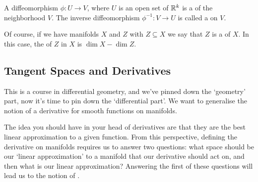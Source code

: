 \documentclass[a4paper, 10pt, twocolumn]{amsart}
\begin{document}
\begin{definition}[Chart]
    A diffeomorphism $\phi: U \rightarrow V$, where $U$ is an open set of $\mathbb{R}^k$ is a  of the neighborhood $V$. The inverse diffeomorphism $\phi^{-1}: V \rightarrow U$ is called a  on $V$.
\end{definition}

Of course, if we have manifolds $X$ and $Z$ with $Z \subseteq X$ we say that $Z$ is a  of $X$. In this case, the  of $Z$ in $X$ is $\dim X - \dim Z$.

\subsection{Tangent Spaces and Derivatives}

This is a course in differential geometry, and we've pinned down the `geometry' part, now it's time to pin down the `differential part'. We want to generalise the notion of a derivative for smooth functions on manifolds. 

The idea you should have in your head of derivatives are that they are the best linear approximation to a given function. From this perspective, defining the derivative on manifolds requires us to answer two questions: 
what space should be our `linear approximation' to a manifold that our derivative should act on, and then what is our linear approximation? Answering the first of these questions will lead us to the notion of .
\end{document}
